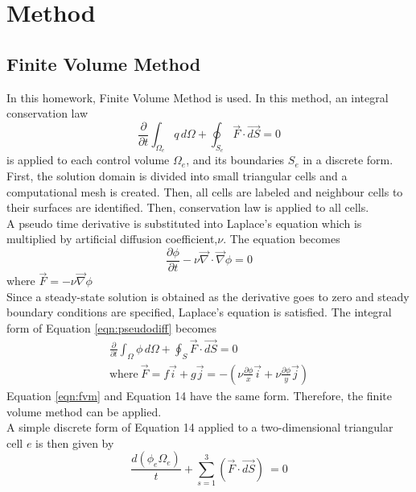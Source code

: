 \documentclass[letterpaper,12pt]{article}
\begin{document}
\section{Method}
\subsection{Finite Volume Method} 
In this homework, Finite Volume Method is used. In this method, an integral conservation law
\begin{equation}
        \frac{\partial}{\partial t}\int_{\Omega_e} q\,d\Omega + \oint_{S_e} \vec{F} \cdot \vec{dS} =0     
        \label{eqn:fvm}
\end{equation}
is applied to each control volume $\Omega_e$, and its boundaries $S_e$ in a discrete form. First, the solution domain is divided into small triangular cells and a computational mesh is created. 
Then, all cells are labeled and neighbour cells to their surfaces are identified. Then, conservation law is applied to all cells.\\
A pseudo time derivative is substituted into Laplace's equation which is multiplied by artificial
diffusion coefficient,$\nu$. The equation becomes
\begin{equation}
        \frac{\partial \phi}{\partial t} - \nu \vec{\nabla}\cdot\vec{\nabla}\phi = 0
        \label{eqn:pseudodiff}
\end{equation}
where $\vec{F}=-\nu\vec{\nabla}\phi$\\
Since a steady-state solution is obtained as the derivative goes to zero and steady boundary conditions 
are specified, Laplace’s equation is satisfied. 
The integral form of Equation \ref{eqn:pseudodiff} becomes
\begin{eqnarray}
        \frac{\partial}{\partial t}\int_{\Omega} \phi\,d\Omega + \oint_S \vec{F} \cdot \vec{dS} =0\ \\
        \mbox{where}\: \vec{F}=f\vec{i}+g\vec{j}=-(\nu\frac{\partial \phi}{x}\vec{i}+\nu\frac{\partial \phi}{y}\vec{j})\nonumber
        \label{eqnarray:genel}
\end{eqnarray}
Equation \ref{eqn:fvm} and Equation 14 have the same form. Therefore, the finite volume method can be applied.\\
A simple discrete form of Equation 14 applied to a two-dimensional triangular cell $e$ is then given by
\begin{equation}
        \frac{d(\phi_e\Omega_e)}{t}+\sum_{s=1}^{3} (\vec{F} \cdot \vec{dS})\ =0
        \label{eqn:diff}
\end{equation}
\end{document}
